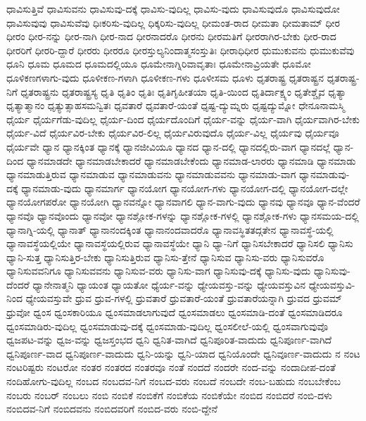 {ಧಾವಿಸುತ್ತಿವೆ
ಧಾವಿಸುವನು
ಧಾವಿಸುವು-ದಕ್ಕೆ
ಧಾವಿಸು-ವುದಿಲ್ಲ
ಧಾವಿಸು-ವುದು
ಧಾವಿಸುವುದೊ
ಧಾವಿಸುವುದೋ
ಧಾವಿಸುವುವು
ಧಾವಿಸುವೆವು
ಧಿಃಕರಿಸು-ವುದಿಲ್ಲ
ಧಿಕ್ಕರಿಸು-ವುದಿಲ್ಲ
ಧೀಮಂತ-ರಾದ
ಧೀಮತಾ
ಧೀಮತಾಮ್
ಧೀರ
ಧೀರಂ
ಧೀರ-ನನ್ನು
ಧೀರ-ನಾಗಿ
ಧೀರ-ನಾದ
ಧೀರನಾದರೊ
ಧೀರನು
ಧೀರಮತಿಗೆ
ಧೀರರಾಗಿರ-ಬೇಕು
ಧೀರ-ರಾದ
ಧೀರರಿಗೆ
ಧೀರರಿ-ದ್ದಾರೆ
ಧೀರರು
ಧೀರರೂ
ಧೀರಸ್ತುಲ್ಯನಿಂದಾತ್ಮಸಂಸ್ತುತಿಃ
ಧೀರಾಧಿಧೀರ
ಧುಮುಕುವನು
ಧುಮುಕುವೆವು
ಧೂನಿ
ಧೂಮ
ಧೂಮದ
ಧೂಮದಲ್ಲಿಯೂ
ಧೂಮೇನಾಗ್ನಿರಿವಾವೃತಾಃ
ಧೂಮೇನಾವ್ರಿಯತೇ
ಧೂಮೋ
ಧೂಳಿಕಣಗಳಾಗು-ವುದು
ಧೂಳೀಕಣ-ಗಳಾಗಿ
ಧೂಳೀಕಣ-ಗಳು
ಧೂಳೀಸಮ
ಧೂಳು
ಧೃತರಾಷ್ಟ್ರ
ಧೃತರಾಷ್ಟ್ರನ
ಧೃತರಾಷ್ಟ್ರ-ನಿಗೆ
ಧೃತರಾಷ್ಟ್ರನು
ಧೃತರಾಷ್ಟ್ರಸ್ಯ
ಧೃತಿ
ಧೃತಿಂ
ಧೃತಿಃ
ಧೃತಿಗೃಹೀತಯಾ
ಧೃತಿ-ಯಿಂದ
ಧೃತಿರ್ದಾಕ್ಷ್ಯಂ
ಧೃತೇಶ್ಚೈವ
ಧೃತ್ಯಾ
ಧೃತ್ಯಾತ್ಮಾನಂ
ಧೃತ್ಯುತ್ಸಾಹಸಮನ್ವಿತಃ
ಧೃವತಾರೆ
ಧೃವತಾರೆ-ಯಂತೆ
ಧೃಷ್ಟ-ದ್ಯುಮ್ನರು
ಧೃಷ್ಟದ್ಯುಮ್ನೋ
ಧೇನೂನಾಮಸ್ಮಿ
ಧೈರ್ಯ
ಧೈರ್ಯಗೆಡು-ವುದಿಲ್ಲ
ಧೈರ್ಯ-ದಿಂದ
ಧೈರ್ಯದೊಂದಿಗೆ
ಧೈರ್ಯ-ವನ್ನು
ಧೈರ್ಯ-ವಾಗಿ
ಧೈರ್ಯವಾಗಿರ-ಬೇಕು
ಧೈರ್ಯ-ವಿದೆ
ಧೈರ್ಯವಿರ-ಬೇಕು
ಧೈರ್ಯವಿರ-ಲಿಲ್ಲ
ಧೈರ್ಯವಿರುವುದೊ
ಧೈರ್ಯ-ವಿಲ್ಲ
ಧೈರ್ಯವು
ಧೈರ್ಯವೂ
ಧೈರ್ಯವೇ
ಧ್ಯಾನ
ಧ್ಯಾನಕ್ಕಿಂತ
ಧ್ಯಾನಕ್ಕೆ
ಧ್ಯಾನಜೀವಿಯೂ
ಧ್ಯಾನದ
ಧ್ಯಾನ-ದಲ್ಲಿ
ಧ್ಯಾನದಲ್ಲಿರು-ವಾಗ
ಧ್ಯಾನದಲ್ಲೆ
ಧ್ಯಾನ-ದಿಂದ
ಧ್ಯಾನಮಾಡದೇ
ಧ್ಯಾನಮಾಡಬೇಕಾದರೆ
ಧ್ಯಾನಮಾಡಬೇಕೆಂದು
ಧ್ಯಾನಮಾಡ-ಲಾರರು
ಧ್ಯಾನಮಾಡಿ
ಧ್ಯಾನಮಾಡು
ಧ್ಯಾನಮಾಡುತ್ತಿರುವ
ಧ್ಯಾನಮಾಡುವ
ಧ್ಯಾನಮಾಡುವನು
ಧ್ಯಾನಮಾಡುವವನು
ಧ್ಯಾನಮಾಡು-ವಾಗ
ಧ್ಯಾನಮಾಡುವು-ದಕ್ಕೆ
ಧ್ಯಾನಮಾಡು-ವುದು
ಧ್ಯಾನಮಾರ್ಗ
ಧ್ಯಾನಯೋಗ
ಧ್ಯಾನಯೋಗ-ಗಳು
ಧ್ಯಾನಯೋಗ-ದಲ್ಲಿ
ಧ್ಯಾನಯೋಗ-ದಲ್ಲೇ
ಧ್ಯಾನಯೋಗಪರೋ
ಧ್ಯಾನಯೋಗಿ
ಧ್ಯಾನವನ್ನೋ
ಧ್ಯಾನವಾಗಲಿ
ಧ್ಯಾನ-ವಾಗು-ವುದು
ಧ್ಯಾನವು
ಧ್ಯಾನವೂ
ಧ್ಯಾನ-ವೆಂದರೆ
ಧ್ಯಾನವೊ
ಧ್ಯಾನವೊಂದು
ಧ್ಯಾನವೋ
ಧ್ಯಾನಶ್ಲೋಕ-ಗಳನ್ನು
ಧ್ಯಾನಶ್ಲೋಕ-ಗಳಲ್ಲಿ
ಧ್ಯಾನಶ್ಲೋಕ-ಗಳು
ಧ್ಯಾನಸಮಯ-ದಲ್ಲಿ
ಧ್ಯಾನಾಗ್ನಿ-ಯಲ್ಲಿ
ಧ್ಯಾನಾತ್
ಧ್ಯಾನಾನಂದಕ್ಕಿಂತ
ಧ್ಯಾನಾನಂದವಾದರೊ
ಧ್ಯಾನಾವಸ್ಥಿತತದ್ಗತೇನ
ಧ್ಯಾನಾವಸ್ಥೆ-ಯಲ್ಲಿ
ಧ್ಯಾನಾವಸ್ಥೆಯಲ್ಲಿಯೇ
ಧ್ಯಾನಾವಸ್ಥೆಯಲ್ಲಿರುವ
ಧ್ಯಾನಾವಸ್ಥೆಯೇ
ಧ್ಯಾನಿ
ಧ್ಯಾ-ನಿಗೆ
ಧ್ಯಾನಿಸಬೇಕಾದರೆ
ಧ್ಯಾನಿಸಲಿ
ಧ್ಯಾನಿಸು
ಧ್ಯಾನಿ-ಸುತ್ತ
ಧ್ಯಾನಿಸುತ್ತಿರ-ಬೇಕು
ಧ್ಯಾನಿಸುತ್ತಿರುವ
ಧ್ಯಾನಿಸು-ತ್ತೇನೆ
ಧ್ಯಾನಿಸುವ
ಧ್ಯಾನಿಸು-ವರು
ಧ್ಯಾನಿಸುವರೊ
ಧ್ಯಾನಿಸುವವನಿಗೂ
ಧ್ಯಾನಿಸುವವನು
ಧ್ಯಾನಿಸುವ-ವರು
ಧ್ಯಾನಿಸು-ವಾಗ
ಧ್ಯಾನಿಸುವು-ದಕ್ಕೆ
ಧ್ಯಾನಿಸು-ವುದು
ಧ್ಯಾನಿಸುವು-ದೆಂದರೆ
ಧ್ಯಾನೇನಾತ್ಮನಿ
ಧ್ಯಾಯಂತ
ಧ್ಯಾಯತೋ
ಧ್ಯೆರ್ಯ-ವನ್ನು
ಧ್ಯೇಯವಸ್ತು-ವನ್ನು
ಧ್ಯೇಯವಸ್ತುವಿನ
ಧ್ಯೇಯವಸ್ತುವಿ-ನಿಂದ
ಧ್ಯೇಯವಸ್ತುವೇ
ಧ್ರುವ
ಧ್ರುವ-ಗಳಲ್ಲಿ
ಧ್ರುವತಾರೆ
ಧ್ರುವತಾರೆ-ಯಂತೆ
ಧ್ರುವತಾರೆಯನ್ನಾಗಿ
ಧ್ರುವದ
ಧ್ರುವಮ್
ಧ್ರುವೋ
ಧ್ವಂಸ
ಧ್ವಂಸಕಾರಿಯೂ
ಧ್ವಂಸಮಾಡಲಾಗುವುದೆ
ಧ್ವಂಸಮಾಡಲು
ಧ್ವಂಸಮಾಡಿ-ದಂತೆ
ಧ್ವಂಸಮಾಡಿದರೂ
ಧ್ವಂಸಮಾಡಿರು-ವುದಿಲ್ಲ
ಧ್ವಂಸಮಾಡುವು-ದಕ್ಕೆ
ಧ್ವಂಸಮಾಡು-ವುದಿಲ್ಲ
ಧ್ವಂಸಲೀಲೆ-ಯಲ್ಲಿ
ಧ್ವಂಸವಾಗುವುವೊ
ಧ್ವಜಪಟ-ವನ್ನು
ಧ್ವಜ-ವನ್ನು
ಧ್ವಜಸ್ತಂಭದ
ಧ್ವನಿ
ಧ್ವನಿತ-ವಾಗಿದೆ
ಧ್ವನಿಪೂರಿತ-ವಾದುದು
ಧ್ವನಿಪೂರ್ಣ-ವಾಗಿದೆ
ಧ್ವನಿಪೂರ್ಣ-ವಾದ
ಧ್ವನಿಪೂರ್ಣ-ವಾದುದು
ಧ್ವನಿ-ಯನ್ನು
ಧ್ವನಿ-ಯಾದ
ಧ್ವನಿಯೊಂದೇ
ಧ್ವನಿವೂರ್ಣ-ವಾದುದು
ನ
ನಂಟ
ನಂಟರಿಷ್ಟರು
ನಂಟರೋ
ನಂತರ
ನಂತರದ
ನಂತರವೂ
ನಂತೆ
ನಂದದೆ
ನಂದರೇ
ನಂದ-ವನ್ನು
ನಂದಾದೀಪ-ದಂತೆ
ನಂದಿಹೋಗು-ವುದಿಲ್ಲ
ನಂಬದ
ನಂಬದವ-ನಿಗೆ
ನಂಬದ-ವರು
ನಂಬದೆ
ನಂಬದೇ
ನಂಬ-ಬಹುದು
ನಂಬಬೇಕೆಂಬ
ನಂಬರು
ನಂಬರ್
ನಂಬಲು
ನಂಬಿ
ನಂಬಿಕೆ
ನಂಬಿಕೆಗೆ
ನಂಬಿಕೆಯ
ನಂಬಿಕೆಯೇ
ನಂಬಿದ
ನಂಬಿದರೆ
ನಂಬಿ-ದಳು
ನಂಬಿದವ-ನಿಗೆ
ನಂಬಿದವನು
ನಂಬಿದವರಿಗೆ
ನಂಬಿದ-ವರು
ನಂಬಿ-ದ್ದೇನೆ
}

